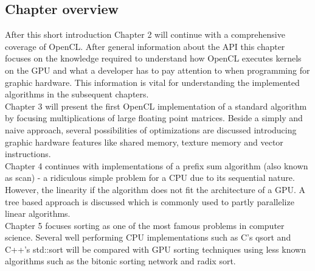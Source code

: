\subsection{Chapter overview}

After this short introduction Chapter 2 will continue with a comprehensive coverage of OpenCL. After general information about the API this chapter focuses on the knowledge required to understand how OpenCL executes kernels on the GPU and what a developer has to pay attention to when programming for graphic hardware. This information is vital for understanding the implemented algorithms in the subsequent chapters.
\\
Chapter 3 will present the first OpenCL implementation of a standard algorithm by focusing multiplications of large floating point matrices. Beside a simply and naive approach, several possibilities of optimizations are discussed introducing graphic hardware features like shared memory, texture memory and vector instructions.
\\
Chapter 4 continues with implementations of a prefix sum algorithm (also known as scan) - a ridiculous  simple problem for a CPU due to its sequential nature. However, the linearity if the algorithm does not fit the architecture of a GPU. A tree based approach is discussed which is commonly used to partly parallelize linear algorithms.
\\
Chapter 5 focuses sorting as one of the most famous problems in computer science. Several well performing CPU implementations such as C's qsort and C++'s std::sort will be compared with GPU sorting techniques using less known algorithms such as the bitonic sorting network and radix sort.

